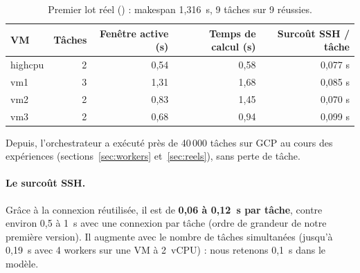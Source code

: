 \begin{table}[H]
\centering\small
\begin{tabular}{lrrrr}
\toprule
\textbf{VM} & \textbf{Tâches} & \textbf{Fenêtre active (s)} & \textbf{Temps de calcul (s)} & \textbf{Surcoût SSH / tâche} \\
\midrule
highcpu & 2 & 0,54 & 0,58 & 0,077 s \\
vm1     & 3 & 1,31 & 1,68 & 0,085 s \\
vm2     & 2 & 0,83 & 1,45 & 0,070 s \\
vm3     & 2 & 0,68 & 0,94 & 0,099 s \\
\bottomrule
\end{tabular}
\caption{Premier lot réel (\mesure{}) : makespan 1,316~s, 9 tâches sur 9 réussies.}
\end{table}

Depuis, l'orchestrateur a exécuté près de 40\,000 tâches sur GCP au cours des
expériences (sections~\ref{sec:workers} et~\ref{sec:reels}), sans perte de tâche.

\paragraph{Le surcoût SSH.} Grâce à la connexion réutilisée, il est de
\textbf{0,06 à 0,12~s par tâche}, contre environ 0,5 à 1~s avec une connexion par
tâche (ordre de grandeur de notre première version). Il augmente avec le nombre
de tâches simultanées (jusqu'à 0,19~s avec 4 workers sur une VM à 2~vCPU) : nous
retenons 0,1~s dans le modèle.
